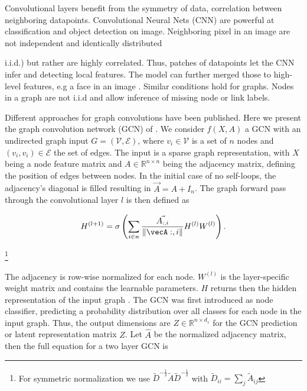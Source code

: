 Convolutional layers benefit from the symmetry of data, correlation between neighboring datapoints. Convolutional Neural Nets (CNN) are powerful at classification and object detection on image. Neighboring pixel in an image are not independent and identically distributed {i.i.d.) but rather are highly correlated. Thus, patches of datapoints let the CNN infer and detecting local features. The model can further merged those to high-level features, e.g a face in an image \cite{bishop_pattern_2006}. Similar conditions hold for graphs. Nodes in a graph are not i.i.d and allow inference of missing node or link labels. 

Different approaches for graph convolutions have been published. Here we present the graph convolution network (GCN) of \cite{kipf_semi-supervised_2017}.
We consider $f(X,A)$ a GCN with an undirected graph input ${G}=(\mathcal{V}, \mathcal{E})$, where $v_{i} \in \mathcal{V}$ is a set of $n$ nodes and  $\left(v_{i}, v_{i}\right) \in \mathcal{E}$ the set of edges. The input is a sparse graph representation, with $X$ being a node feature matrix and $A \in \mathbb{R}^{n \times n}$ being the adjacency matrix, defining the position of edges between nodes. In the initial case of no self-loops, the adjacency's diagonal is filled resulting in $\vec{A}=A+I_{n}$. The graph forward pass through the convolutional layer $l$ is then defined as

\begin{equation}
    H^{(l+1)}=\sigma\left(\sum_{i \in n} \frac{\vec{A_{:,i}}}{\|\vecA:,i\|} H^{(l)} W^{(l)}\right).
\end{equation}


\footnote{For symmetric normalization we use $\tilde{D}^{-\frac{1}{2}} \tilde{A} \tilde{D}^{-\frac{1}{2}}$ with $\tilde{D}_{i i}=\sum_{j} \tilde{A}_{i j}$}

The adjacency is row-wise normalized for each node. $W^{(l)}$ is the layer-specific weight matrix and contains the learnable parameters. $H$ returns then the hidden representation of the input graph \cite{gangemi_modeling_2018}.
The GCN was first introduced as node classifier, predicting a probability distribution over all classes for each node in the input graph. Thus, the output dimensions are $Z \in \mathbb{R}^{n \times d_z}$ for the GCN prediction or latent representation matrix $Z$. Let $\hat{A}$ be the normalized adjacency matrix, then the full equation for a two layer GCN is 

}
